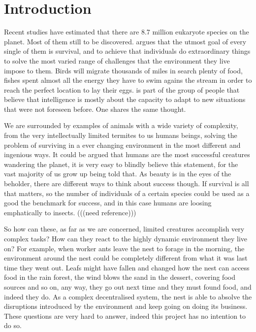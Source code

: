 \chapter{Introduction}
\label{ch:introduction}

Recent studies have estimated that there are 8.7 million eukaryote species on the planet.\cite{10.1371/journal.pbio.1001127} \cite{10.1371/journal.pbio.1001130} Most of them still to be discovered. \citeauthor{dawkins1990selfish} argues that the utmost goal of every single of them is survival, and to achieve that individuals do extraordinary things to solve the most varied range of challenges that the environment they live impose to them. Birds will migrate thousands of miles in search plenty of food, fishes spent almost all the energy they have to swim agains the stream in order to reach the perfect location to lay their eggs. \citeauthor{kennedy2001swarm} is part of the group of people that believe that intelligence is mostly about the capacity to adapt to new situations that were not foreseen before. \cite{kennedy2001swarm} One shares the same thought.

We are surrounded by examples of animals with a wide variety of complexity, from the very intellectually limited termites to us humans beings, solving the problem of surviving in a ever changing environment in the most different and ingenious ways. It could be argued that humans are the most successful creatures wandering the planet, it is very easy to blindly believe this statement, for the vast majority of us grow up being told that. As beauty is in the eyes of the beholder, there are different ways to think about success though. If survival is all that matters, so the number of individuals of a certain species could be used as a good the benchmark for success, and in this case humans are loosing emphatically to insects. (((need reference)))

So how can these, as far as we are concerned, limited creatures accomplish very complex tasks? How can they react to the highly dynamic environment they live on? For example, when worker ants leave the nest to forage in the morning, the environment around the nest could be completely different from what it was last time they went out. Leafs might have fallen and changed how the nest can access food in the rain forest, the wind blows the sand in the dessert, covering food sources and so on, any way, they go out next time and they must found food, and indeed they do. As a complex decentralised system, the nest is able to absolve the disruptions introduced by the environment and keep going on doing its business. These questions are very hard to answer, indeed this project has no intention to do so. 
 
